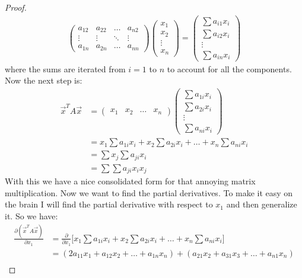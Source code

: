 \documentclass[12pt, letterpaper, onecolumn, conference, final]{IEEEtran}
\theoremstyle{definition}
\theoremstyle{plain}
\begin{document}
\begin{proof}
\begin{equation*}
\begin{split}
\begin{pmatrix}
a_{12} & a_{22} & \dots & a_{n2} \\
\vdots & \vdots & \ddots & \vdots \\
a_{1n} & a_{2n} & \dots & a_{nn}
\end{pmatrix} \begin{pmatrix}
x_1 \\
x_2 \\
\vdots \\
x_n
\end{pmatrix} = \begin{pmatrix}
\sum a_{i1}x_i \\
\sum a_{i2}x_i \\
\vdots \\
\sum a_{in}x_i
\end{pmatrix}
\end{split}
\end{equation*}
where the sums are iterated from $i = 1$ to $n$ to account for all the components. Now the next step is:
\begin{equation*}
\begin{split}
\overrightarrow{x}^TA\overrightarrow{x} &= \begin{pmatrix}
x_1 & x_2 & \dots & x_n
\end{pmatrix} \begin{pmatrix}
\sum a_{1i}x_i \\
\sum a_{2i}x_i \\
\vdots \\
\sum a_{ni}x_i
\end{pmatrix} \\
&= x_1\sum a_{1i}x_i + x_2\sum a_{2i}x_i + \dots + x_n\sum a_{ni}x_i \\
&= \sum x_j \sum a_{ji}x_i \\
&= \sum\sum a_{ji}x_ix_j
\end{split}
\end{equation*}
With this we have a nice consolidated form for that annoying matrix multiplication. Now we want to find the partial derivatives. To make it easy on the brain I will find the partial derivative with respect to $x_1$ and then generalize it. So we have:
\begin{equation*}
\begin{split}
\frac{\partial(\overrightarrow{x}^TA\overrightarrow{x})}{\partial x_1} &= \frac{\partial}{\partial x_1} \Big[ x_1\sum a_{1i}x_i + x_2\sum a_{2i}x_i + \dots + x_n\sum a_{ni}x_i \Big] \\
&= (2a_{11}x_1 + a_{12}x_2 + \dots + a_{1n}x_n) + (a_{21}x_2 + a_{31}x_3 + \dots + a_{n1}x_n) \\

\end{split}
\end{equation*}
\end{proof}
\end{document}
